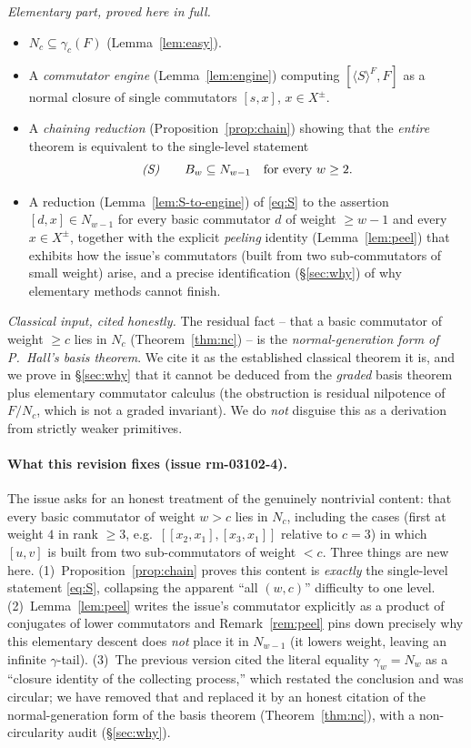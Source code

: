 \documentclass{amsart}
\theoremstyle{definition}
\theoremstyle{remark}
\begin{document}
\emph{Elementary part, proved here in full.}
\begin{itemize}
\item $N_c\subseteq\gamma_c(F)$ (Lemma~\ref{lem:easy}).
\item A \emph{commutator engine} (Lemma~\ref{lem:engine}) computing $[\langle
S\rangle^{F},F]$ as a normal closure of single commutators $[s,x]$, $x\in X^{\pm}$.
\item A \emph{chaining reduction} (Proposition~\ref{prop:chain}) showing that the
\emph{entire} theorem is equivalent to the single-level statement
\begin{equation}\label{eq:S}
\text{\emph{(S)}}\qquad B_w\subseteq N_{w-1}\quad\text{for every }w\ge 2 .
\end{equation}
\item A reduction (Lemma~\ref{lem:S-to-engine}) of \eqref{eq:S} to the assertion
$[d,x]\in N_{w-1}$ for every basic commutator $d$ of weight $\ge w-1$ and every
$x\in X^{\pm}$, together with the explicit \emph{peeling} identity
(Lemma~\ref{lem:peel}) that exhibits how the issue's commutators (built from two
sub-commutators of small weight) arise, and a precise identification
(\S\ref{sec:why}) of why elementary methods cannot finish.
\end{itemize}

\emph{Classical input, cited honestly.} The residual fact -- that a basic
commutator of weight $\ge c$ lies in $N_c$ (Theorem~\ref{thm:nc}) -- is the
\emph{normal-generation form of P.~Hall's basis theorem}. We cite it as the
established classical theorem it is, and we prove in \S\ref{sec:why} that it cannot
be deduced from the \emph{graded} basis theorem plus elementary commutator calculus
(the obstruction is residual nilpotence of $F/N_c$, which is not a graded
invariant). We do \emph{not} disguise this as a derivation from strictly weaker
primitives.

\paragraph{What this revision fixes (issue rm-03102-4).}
The issue asks for an honest treatment of the genuinely nontrivial content: that
every basic commutator of weight $w>c$ lies in $N_c$, including the cases (first at
weight $4$ in rank $\ge3$, e.g.\ $[[x_2,x_1],[x_3,x_1]]$ relative to $c=3$) in which
$[u,v]$ is built from two sub-commutators of weight $<c$. Three things are new here.
(1)~Proposition~\ref{prop:chain} proves this content is \emph{exactly} the
single-level statement \eqref{eq:S}, collapsing the apparent ``all $(w,c)$''
difficulty to one level. (2)~Lemma~\ref{lem:peel} writes the issue's commutator
explicitly as a product of conjugates of lower commutators and
Remark~\ref{rem:peel} pins down precisely why this elementary descent does
\emph{not} place it in $N_{w-1}$ (it lowers weight, leaving an infinite
$\gamma$-tail). (3)~The previous version cited the literal equality $\gamma_w=N_w$
as a ``closure identity of the collecting process,'' which restated the conclusion
and was circular; we have removed that and replaced it by an honest citation of the
normal-generation form of the basis theorem (Theorem~\ref{thm:nc}), with a
non-circularity audit (\S\ref{sec:why}).
\end{document}
